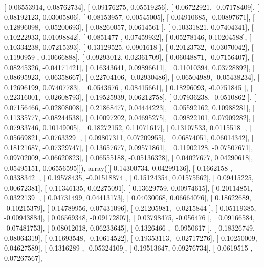 \documentclass{article}
\begin{document}
       [ 0.06553914,  0.08762734],
       [ 0.09176275,  0.05519256],
       [ 0.06722921, -0.07178409],
       [ 0.08192123,  0.03005806],
       [ 0.08153957,  0.00545005],
       [ 0.04910685, -0.00897671],
       [ 0.12896098, -0.05200693],
       [ 0.08260057,  0.0614561 ],
       [ 0.10331821,  0.07404341],
       [ 0.10222933,  0.01098842],
       [ 0.0851477 ,  0.07459932],
       [ 0.05278146,  0.10204588],
       [ 0.10334238,  0.07215393],
       [ 0.13129525,  0.0901618 ],
       [ 0.20123732, -0.03070042],
       [ 0.1190959 ,  0.10666888],
       [ 0.09293012,  0.02361709],
       [ 0.06048871, -0.07156407],
       [ 0.08245326, -0.04171421],
       [ 0.16343641,  0.09896611],
       [ 0.11010394,  0.03728892],
       [ 0.08695923, -0.06358667],
       [ 0.22704106, -0.02930486],
       [ 0.06504989, -0.05438234],
       [ 0.12696199,  0.07407783],
       [ 0.0543676 ,  0.08415661],
       [ 0.18296093, -0.0751845 ],
       [ 0.22316001, -0.02608793],
       [ 0.19525939,  0.06212758],
       [ 0.07936238, -0.0510862 ],
       [ 0.07156466, -0.02808008],
       [ 0.21868477,  0.04444223],
       [ 0.05592162,  0.10988281],
       [ 0.11335777, -0.08244538],
       [ 0.10097202,  0.04695275],
       [ 0.09822101,  0.07909282],
       [ 0.07933746,  0.10149005],
       [ 0.18272152,  0.11071617],
       [ 0.13107533,  0.0115518 ],
       [ 0.05669821, -0.0763329 ],
       [ 0.09807311,  0.07209955],
       [ 0.06874051,  0.06014342],
       [ 0.18121687, -0.07329747],
       [ 0.13657677,  0.09571861],
       [ 0.11902128, -0.07507671],
       [ 0.09702009, -0.06620823],
       [ 0.06555188, -0.05136328],
       [ 0.04027677,  0.04290618],
       [ 0.05495151,  0.06556595]]), array([[ 0.14300734,  0.04299136],
       [ 0.1662158 ,  0.0338342 ],
       [ 0.19578435, -0.01518874],
       [ 0.15124354,  0.01575562],
       [ 0.09415225,  0.00672381],
       [ 0.11346135,  0.02275091],
       [ 0.13629759,  0.00974615],
       [ 0.20114851,  0.0322139 ],
       [ 0.04731499,  0.04413173],
       [ 0.04030068,  0.06664076],
       [ 0.18622689, -0.10215379],
       [ 0.14789956,  0.07431096],
       [ 0.21205981, -0.0215844 ],
       [ 0.05119385, -0.00943884],
       [ 0.06569348, -0.09172807],
       [ 0.03798475, -0.056476  ],
       [ 0.09166584, -0.07481753],
       [ 0.08012018,  0.06233645],
       [ 0.1326466 , -0.0950617 ],
       [ 0.18326749,  0.08064319],
       [ 0.11693548, -0.10614522],
       [ 0.19353113, -0.02717276],
       [ 0.10250009,  0.04627589],
       [ 0.1316289 , -0.05324109],
       [ 0.19513647,  0.09276734],
       [ 0.0619515 ,  0.07267567],
\end{document}
